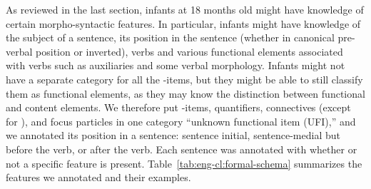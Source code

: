 As reviewed in the last section, infants at 18 months old might have knowledge of certain morpho-syntactic features. In particular, infants might have knowledge of the subject of a sentence, its position in the sentence (whether in canonical pre-verbal position or inverted), verbs and various functional elements associated with verbs such as auxiliaries and some verbal morphology. Infants might not have a separate category for all the \twh-items, but they might be able to still classify them as functional elements, as they may know the distinction between functional and content elements. We therefore put \twh-items, quantifiers, connectives (except for ), and focus particles in one category ``unknown functional item (UFI),'' and we annotated its position in a sentence: sentence initial, sentence-medial but before the verb, or after the verb. Each sentence was annotated with whether or not a specific feature is present. Table~\ref{tab:eng-cl:formal-schema} summarizes the features we annotated and their examples.  


